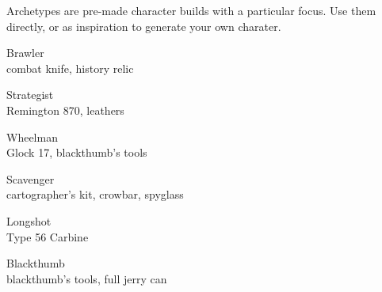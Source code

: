 
Archetypes are pre-made character builds with a particular focus. Use them directly, or as inspiration to generate your own charater.

\vspace*{-1em}
\begin{flushleft}

\begin{multicols}{2}
\begin{describe}{Brawler} \\
   
combat knife, history relic
\end{describe}

\begin{describe}{Strategist} \\
   
Remington 870, leathers
\end{describe}
\end{multicols}

\vspace*{-1.5em}

\begin{multicols}{2}
\begin{describe}{Wheelman} \\
   
Glock 17, blackthumb's tools
\end{describe}

\begin{describe}{Scavenger} \\
   
cartographer's kit, crowbar, spyglass
\end{describe}
\end{multicols}

\vspace*{-1.5em}

\begin{multicols}{2}
\begin{describe}{Longshot} \\
   
Type 56 Carbine
\end{describe}

\begin{describe}{Blackthumb} \\
   
blackthumb's tools, full jerry can
\end{describe}
\end{multicols}

\end{flushleft}
\vspace*{-1.5em}
